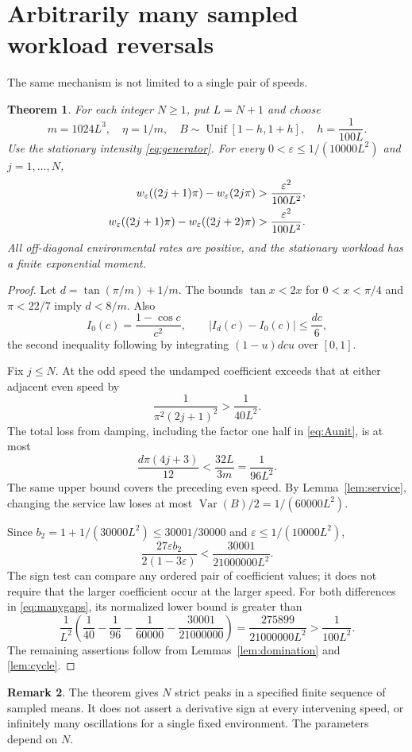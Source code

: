 \documentclass[aap,preprint]{imsart}
\numberwithin{equation}{section}
\theoremstyle{plain}
\newtheorem{theorem}{Theorem}[section]
\theoremstyle{definition}
\newtheorem{remark}[theorem]{Remark}
\newcommand{\1}{\mathbf 1}
\newcommand{\eps}{\varepsilon}
\DeclareMathOperator{\Var}{Var}
\DeclareMathOperator{\Unif}{Unif}
\begin{document}
\section{Arbitrarily many sampled workload reversals}\label{sec:many}
The same mechanism is not limited to a single pair of speeds.
\begin{theorem}\label{thm:many}
For each integer $N\ge1$, put $L=N+1$ and choose
\begin{equation}\label{eq:manyparameters}
 m=1024L^3,\quad \eta=1/m,\quad
 B\sim\Unif[1-h,1+h],\quad h=\frac1{100L}.
\end{equation}
Use the stationary intensity \eqref{eq:generator}. For every $0<\eps\le1/(10000L^2)$ and $j=1,\ldots,N$,
\begin{align}\label{eq:manygaps}
 w_\eps((2j+1)\pi)-w_\eps(2j\pi)&>\frac{\eps^2}{100L^2},\notag\\
 w_\eps((2j+1)\pi)-w_\eps((2j+2)\pi)&>\frac{\eps^2}{100L^2}.
\end{align}
All off-diagonal environmental rates are positive, and the stationary workload has a finite exponential moment.
\end{theorem}
\begin{proof}
Let $d=\tan(\pi/m)+1/m$. The bounds $\tan x<2x$ for $0<x<\pi/4$ and $\pi<22/7$ imply $d<8/m$. Also
\[
 I_0(c)=\frac{1-\cos c}{c^2},\qquad
 |I_d(c)-I_0(c)|\le\frac{dc}{6},
\]
the second inequality following by integrating $(1-u)dcu$ over $[0,1]$.

Fix $j\le N$. At the odd speed the undamped coefficient exceeds that at either adjacent even speed by
\[
 \frac{1}{\pi^2(2j+1)^2}>\frac1{40L^2}.
\]
The total loss from damping, including the factor one half in \eqref{eq:Aunit}, is at most
\[
 \frac{d\pi(4j+3)}{12}<\frac{32L}{3m}=\frac1{96L^2}.
\]
The same upper bound covers the preceding even speed. By Lemma~\ref{lem:service}, changing the service law loses at most $\Var(B)/2=1/(60000L^2)$.

Since $b_2=1+1/(30000L^2)\le30001/30000$ and $\eps\le1/(10000L^2)$,
\[
 \frac{27\eps b_2}{2(1-3\eps)}<\frac{30001}{21000000L^2}.
\]
The sign test can compare any ordered pair of coefficient values; it does not require that the larger coefficient occur at the larger speed. For both differences in \eqref{eq:manygaps}, its normalized lower bound is greater than
\[
 \frac1{L^2}\left(\frac1{40}-\frac1{96}-\frac1{60000}
                         -\frac{30001}{21000000}\right)
 =\frac{275899}{21000000L^2}>\frac1{100L^2}.
\]
The remaining assertions follow from Lemmas~\ref{lem:domination} and \ref{lem:cycle}.
\end{proof}
\begin{remark}
The theorem gives $N$ strict peaks in a specified finite sequence of sampled means. It does not assert a derivative sign at every intervening speed, or infinitely many oscillations for a single fixed environment. The parameters depend on $N$.
\end{remark}
\end{document}
